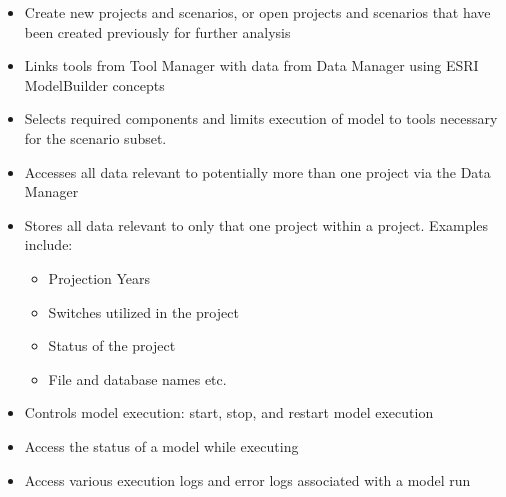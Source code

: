 \documentclass[titlepage]{article}
\begin{document}
\begin{itemize}
\item Create new projects and scenarios, or open projects and scenarios that have been created previously for further analysis
\item Links tools from Tool Manager with data from Data Manager using ESRI ModelBuilder concepts
\item Selects required components and limits execution of model to tools necessary for the scenario subset.
\item Accesses all data relevant to potentially more than one project via the Data Manager
\item Stores all data relevant to only that one project within a project. Examples include:
\begin{itemize}
\item Projection Years
\item Switches utilized in the project
\item Status of the project
\item File and database names etc.
\end{itemize}
\item Controls model execution: start, stop, and restart model execution
\item Access the status of a model while executing
\item Access various execution logs and error logs associated with a model run
\end{itemize}
\end{document}
